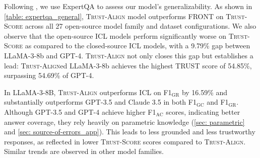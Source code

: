 \documentclass{article} %
\newcommand{\method}[0]{\textsc{Trust-Align}}
\newcommand{\metric}[0]{\textsc{Trust-Score}}
\begin{document}

Following \citet{huang2024training}, we use ExpertQA \citep{malaviya2024expertqaexpertcuratedquestionsattributed} to assess our model's generalizability. As shown in \cref{table: expertqa_general}, \method{} model outperforms FRONT on \metric{} across all 27 open-source model family and dataset configurations. We also observe that the open-source ICL models perform significantly worse on \metric{} as compared to the closed-source ICL models, with a 9.79\% gap between LLaMA-3-8b and GPT-4. \method{} not only closes this gap but establishes a lead: \method{}ed LLaMA-3-8b achieves the highest TRUST score of 54.85\%, surpassing 54.69\% of GPT-4.

In LLaMA-3-8B, \method{} outperforms ICL on F1$_{\text{GR}}$ by 16.59\% and substantially outperforms GPT-3.5 and Claude 3.5 in both F1$_{\text{GC}}$ and F1$_{\text{GR}}$. Although GPT-3.5 and GPT-4 achieve higher {F1$_{\text{AC}}$} scores, indicating better answer coverage, they rely heavily on parametric knowledge (\cref{sec: parametric} and \cref{sec: source-of-errors_app}). This leads to less grounded and less trustworthy responses, as reflected in lower \metric{} scores compared to \method{}. Similar trends are observed in other model families.


\end{document}

